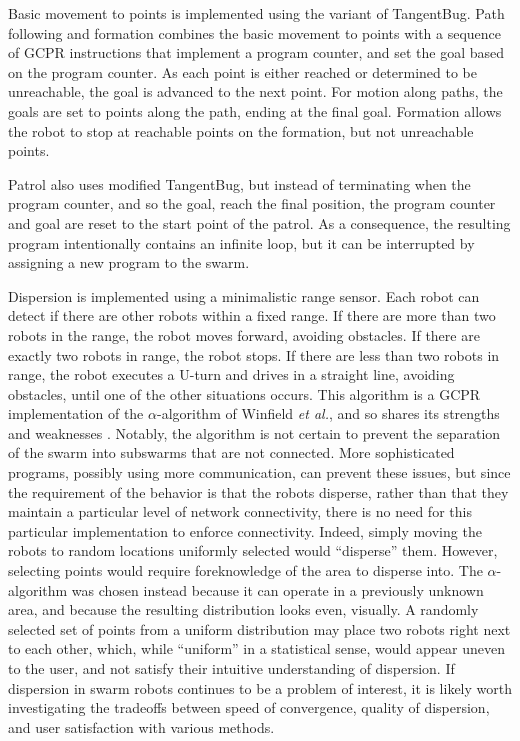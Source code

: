 Basic movement to points is implemented using the variant of TangentBug.
Path following and formation combines the basic movement to points with a sequence of GCPR instructions that implement a program counter, and set the goal based on the program counter. 
As each point is either reached or determined to be unreachable, the goal is advanced to the next point.
For motion along paths, the goals are set to points along the path, ending at the final goal. 
Formation allows the robot to stop at reachable points on the formation, but not unreachable points.  

Patrol also uses modified TangentBug, but instead of terminating when the program counter, and so the goal, reach the final position, the program counter and goal are reset to the start point of the patrol.  
As a consequence, the resulting program intentionally contains an infinite loop, but it can be interrupted by assigning a new program to the swarm. 

Dispersion is implemented using a minimalistic range sensor. 
Each robot can detect if there are other robots within a fixed range. 
If there are more than two robots in the range, the robot moves forward, avoiding obstacles. 
If there are exactly two robots in range, the robot stops. If there are less than two robots in range, the robot executes a U-turn and drives in a straight line, avoiding obstacles, until one of the other situations occurs. 
This algorithm is a GCPR implementation of the $\alpha$-algorithm of Winfield \emph{et al.}, and so shares its strengths and weaknesses  \citep{winfield2008modelling}.
Notably, the algorithm is not certain to prevent the separation of the swarm into subswarms that are not connected. 
More sophisticated programs, possibly using more communication, can prevent these issues, but since the requirement of the behavior is that the robots disperse, rather than that they maintain a particular level of network connectivity, there is no need for this particular implementation to enforce connectivity. 
Indeed, simply moving the robots to random locations uniformly selected would ``disperse'' them. 
However, selecting points would require foreknowledge of the area to disperse into. 
The $\alpha$-algorithm was chosen instead because it can operate in a previously unknown area, and because the resulting distribution looks even, visually. 
A randomly selected set of points from a uniform distribution may place two robots right next to each other, which, while ``uniform'' in a statistical sense, would appear uneven to the user, and not satisfy their intuitive understanding of dispersion. 
If dispersion in swarm robots continues to be a problem of interest, it is likely worth investigating the tradeoffs between speed of convergence, quality of dispersion, and user satisfaction with various methods. 

